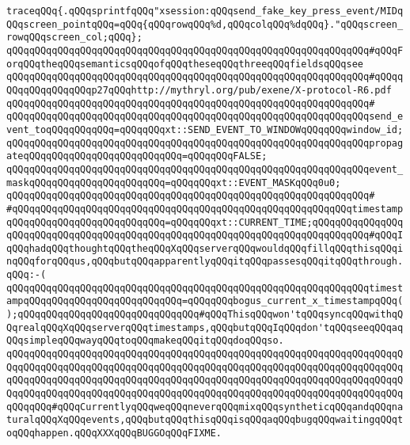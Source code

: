\newline
\verb|traceqQQq{.qQQqsprintfqQQq"xsession:qQQqsend_fake_key_press_event/MIDqQQqscreen_pointqQQq=qQQq{qQQqrowqQQq%d,qQQqcolqQQq%dqQQq}."qQQqscreen_rowqQQqscreen_col;qQQq};|\newline
\verb|qQQqqQQqqQQqqQQqqQQqqQQqqQQqqQQqqQQqqQQqqQQqqQQqqQQqqQQqqQQqqQQq#qQQqForqQQqtheqQQqsemanticsqQQqofqQQqtheseqQQqthreeqQQqfieldsqQQqsee|\newline
\verb|qQQqqQQqqQQqqQQqqQQqqQQqqQQqqQQqqQQqqQQqqQQqqQQqqQQqqQQqqQQqqQQq#qQQqqQQqqQQqqQQqqQQqp27qQQqhttp://mythryl.org/pub/exene/X-protocol-R6.pdf|\newline
\verb|qQQqqQQqqQQqqQQqqQQqqQQqqQQqqQQqqQQqqQQqqQQqqQQqqQQqqQQqqQQqqQQq#|\newline
\verb|qQQqqQQqqQQqqQQqqQQqqQQqqQQqqQQqqQQqqQQqqQQqqQQqqQQqqQQqqQQqqQQqsend_event_toqQQqqQQqqQQq=qQQqqQQqxt::SEND_EVENT_TO_WINDOWqQQqqQQqwindow_id;|\newline
\verb|qQQqqQQqqQQqqQQqqQQqqQQqqQQqqQQqqQQqqQQqqQQqqQQqqQQqqQQqqQQqqQQqpropagateqQQqqQQqqQQqqQQqqQQqqQQqqQQq=qQQqqQQqFALSE;|\newline
\verb|qQQqqQQqqQQqqQQqqQQqqQQqqQQqqQQqqQQqqQQqqQQqqQQqqQQqqQQqqQQqqQQqevent_maskqQQqqQQqqQQqqQQqqQQqqQQq=qQQqqQQqxt::EVENT_MASKqQQq0u0;|\newline
\verb|qQQqqQQqqQQqqQQqqQQqqQQqqQQqqQQqqQQqqQQqqQQqqQQqqQQqqQQqqQQqqQQq#|\newline
\verb|#qQQqqQQqqQQqqQQqqQQqqQQqqQQqqQQqqQQqqQQqqQQqqQQqqQQqqQQqqQQqtimestampqQQqqQQqqQQqqQQqqQQqqQQqqQQq=qQQqqQQqxt::CURRENT_TIME;qQQqqQQqqQQqqQQqqQQqqQQqqQQqqQQqqQQqqQQqqQQqqQQqqQQqqQQqqQQqqQQqqQQqqQQqqQQqqQQq#qQQqIqQQqhadqQQqthoughtqQQqtheqQQqXqQQqserverqQQqwouldqQQqfillqQQqthisqQQqinqQQqforqQQqus,qQQqbutqQQqapparentlyqQQqitqQQqpassesqQQqitqQQqthrough.qQQq:-(|\newline
\verb|qQQqqQQqqQQqqQQqqQQqqQQqqQQqqQQqqQQqqQQqqQQqqQQqqQQqqQQqqQQqqQQqtimestampqQQqqQQqqQQqqQQqqQQqqQQqqQQq=qQQqqQQqbogus_current_x_timestampqQQq();qQQqqQQqqQQqqQQqqQQqqQQqqQQqqQQq#qQQqThisqQQqwon'tqQQqsyncqQQqwithqQQqrealqQQqXqQQqserverqQQqtimestamps,qQQqbutqQQqIqQQqdon'tqQQqseeqQQqaqQQqsimpleqQQqwayqQQqtoqQQqmakeqQQqitqQQqdoqQQqso.|\newline
\verb|qQQqqQQqqQQqqQQqqQQqqQQqqQQqqQQqqQQqqQQqqQQqqQQqqQQqqQQqqQQqqQQqqQQqqQQqqQQqqQQqqQQqqQQqqQQqqQQqqQQqqQQqqQQqqQQqqQQqqQQqqQQqqQQqqQQqqQQqqQQqqQQqqQQqqQQqqQQqqQQqqQQqqQQqqQQqqQQqqQQqqQQqqQQqqQQqqQQqqQQqqQQqqQQqqQQqqQQqqQQqqQQqqQQqqQQqqQQqqQQqqQQqqQQqqQQqqQQqqQQqqQQqqQQqqQQqqQQqqQQqqQQqqQQq#qQQqCurrentlyqQQqweqQQqneverqQQqmixqQQqsyntheticqQQqandqQQqnaturalqQQqXqQQqevents,qQQqbutqQQqthisqQQqisqQQqaqQQqbugqQQqwaitingqQQqtoqQQqhappen.qQQqXXXqQQqBUGGOqQQqFIXME.|\newline

